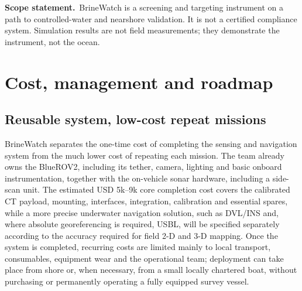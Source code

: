 \documentclass[10pt,a4paper]{article}
\begin{document}
\begin{panel}
\small\sffamily \textbf{\color{deepblue}Scope statement.}\ BrineWatch is a screening and targeting
instrument on a path to controlled-water and nearshore validation. It is not a certified
compliance system. Simulation results are not field measurements; they demonstrate the
instrument, not the ocean.
\end{panel}

\section{Cost, management and roadmap}

\subsection*{\sffamily\color{deepblue}Reusable system, low-cost repeat missions}

BrineWatch separates the one-time cost of completing the sensing and navigation system from the much lower cost of repeating each mission. The team already owns the BlueROV2, including its tether, camera, lighting and basic onboard instrumentation, together with the on-vehicle sonar hardware, including a side-scan unit. The estimated USD 5k--9k core completion cost covers the calibrated CT payload, mounting, interfaces, integration, calibration and essential spares, while a more precise underwater navigation solution, such as DVL/INS and, where absolute georeferencing is required, USBL, will be specified separately according to the accuracy required for field 2-D and 3-D mapping. Once the system is completed, recurring costs are limited mainly to local transport, consumables, equipment wear and the operational team; deployment can take place from shore or, when necessary, from a small locally chartered boat, without purchasing or permanently operating a fully equipped survey vessel.
\end{document}
